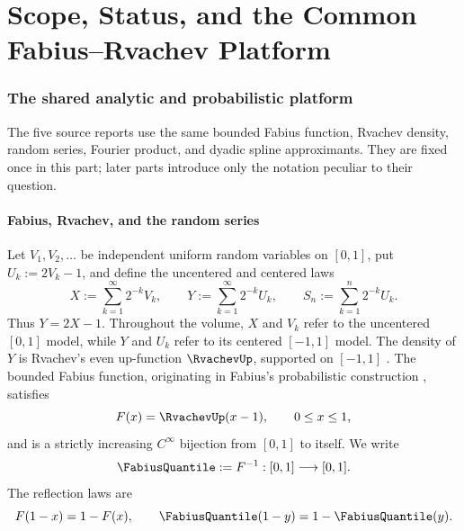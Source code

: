 
\part{Scope, Status, and the Common Fabius--Rvachev Platform}

\section{The shared analytic and probabilistic platform}
\label{sec:common-platform}
\label{is:p1:sec:platform}

The five source reports use the same bounded Fabius function, Rvachev density, random series, Fourier product, and dyadic spline approximants.  They are fixed once in this part; later parts introduce only the notation peculiar to their question.


\subsection{Fabius, Rvachev, and the random series}

Let $V_1,V_2,\ldots$ be independent uniform random variables on $[0,1]$, put
$U_k:=2V_k-1$, and define the uncentered and centered laws
\begin{equation}
 X:=\sum_{k=1}^{\infty}2^{-k}V_k,
 \qquad
 Y:=\sum_{k=1}^{\infty}2^{-k}U_k,
 \qquad
 S_n:=\sum_{k=1}^{n}2^{-k}U_k.
 \label{is:p1:eq:Y-prefix}
\end{equation}
Thus $Y=2X-1$.  Throughout the volume, $X$ and $V_k$ refer to the
uncentered $[0,1]$ model, while $Y$ and $U_k$ refer to its centered
$[-1,1]$ model.
The density of $Y$ is Rvachev's even up-function $\RvachevUp$, supported on $[-1,1]$ \cite{is:p1:Rvachev1990,is:p1:Arias1982,is:p1:ProveItPrimary}.
The bounded Fabius function, originating in Fabius's probabilistic construction \cite{is:p1:Fabius1966}, satisfies
\begin{equation}
 F(x)=\RvachevUp(x-1),\qquad 0\le x\le1,
 \label{is:p1:eq:F-up-shift}
\end{equation}
and is a strictly increasing $C^\infty$ bijection from $[0,1]$ to itself.  We write
\begin{equation}
 \FabiusQuantile:=F^{-1}:[0,1]\longrightarrow[0,1].
 \label{is:p1:eq:G-def}
\end{equation}
The reflection laws are
\begin{equation}
 F(1-x)=1-F(x),\qquad \FabiusQuantile(1-y)=1-\FabiusQuantile(y).
 \label{is:p1:eq:reflection}
\end{equation}

